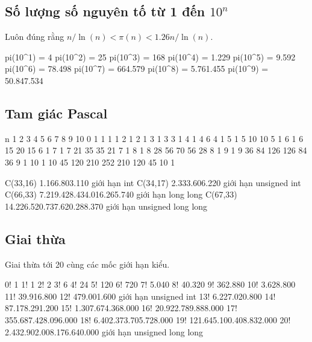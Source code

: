 \documentclass[11pt]{article}
\begin{document}
\subsection{\texorpdfstring{Số lượng số nguyên tố từ 1 đến $10^n$}{Số lượng số nguyên tố từ 1 đến lũy thừa 10 mũ n}}

Luôn đúng rằng $n/\ln(n) < \pi(n) < 1.26 n/\ln(n)$.

\begingroup\scriptsize
\begin{vncode}
pi(10^1) = 4              pi(10^2) = 25             pi(10^3) = 168
pi(10^4) = 1.229          pi(10^5) = 9.592          pi(10^6) = 78.498
pi(10^7) = 664.579        pi(10^8) = 5.761.455      pi(10^9) = 50.847.534
\end{vncode}
\endgroup


\subsection{Tam giác Pascal}

\begingroup\scriptsize
\begin{vncode}
n   1   2    3    4    5    6    7   8   9  10
0     1
1     1   1
2     1   2   1
3     1   3   3    1
4     1   4   6    4    1
5     1   5  10   10    5    1
6     1   6  15   20   15    6    1
7     1   7  21   35   35   21    7    1
8     1   8  28   56   70   56   28    8   1
9     1   9  36   84  126  126   84   36   9   1
10    1  10  45  120  210  252  210  120  45  10   1

C(33,16)       1.166.803.110             giới hạn int
C(34,17)       2.333.606.220             giới hạn unsigned int
C(66,33)       7.219.428.434.016.265.740 giới hạn long long
C(67,33)      14.226.520.737.620.288.370 giới hạn unsigned long long
\end{vncode}
\endgroup


\subsection{Giai thừa}

Giai thừa tới 20 cùng các mốc giới hạn kiểu.

\begingroup\scriptsize
\begin{vncode}
 0!                         1
 1!                         1
 2!                         2
 3!                         6
 4!                        24
 5!                       120
 6!                       720
 7!                     5.040
 8!                    40.320
 9!                   362.880
10!                 3.628.800
11!                39.916.800
12!               479.001.600  giới hạn unsigned int
13!             6.227.020.800
14!            87.178.291.200
15!         1.307.674.368.000
16!        20.922.789.888.000
17!       355.687.428.096.000
18!     6.402.373.705.728.000
19!   121.645.100.408.832.000
20! 2.432.902.008.176.640.000  giới hạn unsigned long long
\end{vncode}
\endgroup
\end{document}
